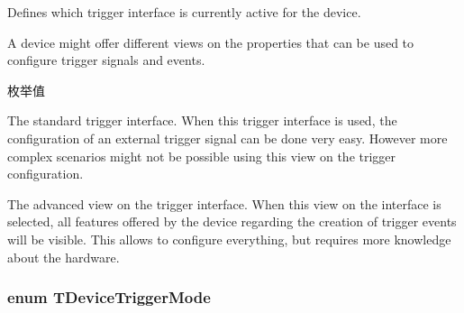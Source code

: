 Defines which trigger interface is currently active for the device. 

A device might offer different views on the properties that can be used to configure trigger signals and events. \begin{Desc}
\item[枚举值]\par
\begin{description}
\item[{\em 
\hypertarget{group___device_specific_interface_ggac3ca527d649e5a24d75535f263bb5b8aac060d78e9e6851cc1a00ba5285c3e037}{dti\+Standard}\label{group___device_specific_interface_ggac3ca527d649e5a24d75535f263bb5b8aac060d78e9e6851cc1a00ba5285c3e037}
}]The standard trigger interface. When this trigger interface is used, the configuration of an external trigger signal can be done very easy. However more complex scenarios might not be possible using this view on the trigger configuration. \item[{\em 
\hypertarget{group___device_specific_interface_ggac3ca527d649e5a24d75535f263bb5b8aad95b363d078c1117a21aaf19689e7866}{dti\+Advanced}\label{group___device_specific_interface_ggac3ca527d649e5a24d75535f263bb5b8aad95b363d078c1117a21aaf19689e7866}
}]The advanced view on the trigger interface. When this view on the interface is selected, all features offered by the device regarding the creation of trigger events will be visible. This allows to configure everything, but requires more knowledge about the hardware. \end{description}
\end{Desc}
\hypertarget{group___device_specific_interface_ga01d26702f49062f849cb0ce7f517a753}{
\subsubsection[{T\+Device\+Trigger\+Mode}]{\setlength{\rightskip}{0pt plus 5cm}enum {\bf T\+Device\+Trigger\+Mode}}}\label{group___device_specific_interface_ga01d26702f49062f849cb0ce7f517a753}


